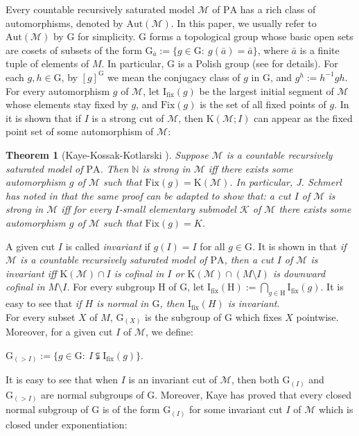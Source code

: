 \documentclass[11pt]{article}
\newtheorem{theorem}{Theorem}[section]
\theoremstyle{plain}
\theoremstyle{definition}
\newcommand{\M}{\mathcal{M}}
\newcommand{\K}{\mathcal{K}}
\newcommand{\NN}{\mathbb{N}}
\newcommand{\I}{\mathrm{I_{fix}}}
\newcommand{\G}{\mathrm{G}}
\newcommand{\A}{\mathrm{Aut}}
\newcommand{\pa}{\mathrm{PA}}
\newcommand{\fix}{\mathrm{Fix}}
\newcommand{\KK}{\mathrm{K}}
\begin{document}
Every countable recursively saturated model $ \M $ of $ \pa $ has a rich class of automorphisms, denoted by $ \A(\M) $. 
In this paper, we usually refer to $\A(\M)$ by $\G$ for simplicity. $\G$ forms a topological group whose  basic open sets are cosets of subsets of the form ${\G_{\bar{a}}:=\{g\in\G: \ g(\bar{a})=\bar{a} \}}  $, where $ \bar{a}$ is a finite tuple of elements of $ M $. In particular, $\G$ is a Polish group (see \cite{km} for details). For each $g,h\in\G$, by $[g]^{\G}$ we mean the conjugacy class of $g$ in $\G$, and $g^{h}:=h^{-1}gh$. For every automorphism $ g $ of $ \M $, let $ \I(g) $ be the largest initial segment of $ \M $ whose elements stay fixed by $ g $, and $ \fix(g) $ is the set of all fixed points of $ g $.  In \cite{kkk} it is shown that if $I$ is a strong cut of $\M$, then $\KK(\M;I)$ can appear as the fixed point set of some automorphism of $\M$:
\begin{theorem}[Kaye-Kossak-Kotlarski \cite{kkk}]
Suppose $\M$ is a countable recursively saturated model of $\pa$. Then $\NN$ is strong in $\M$ iff there exists some automorphism $g$ of $\M$ such that $\fix(g)=\KK(\M)$. In particular, J. Schmerl has noted in \cite[Theorem 5.7]{kkk} that the same proof can be adapted to show that: a cut $I$ of $\M$ is strong in $\M$ iff for every $I$-small elementary submodel $\K$ of $\M$ there exists some automorphism  $g$ of $\M$ such that $\fix(g)=K$.
\end{theorem}
A given cut $ I $ is called \textit{invariant} if $ g(I)=I $ for all $ g\in\G $. It is shown in \cite{kkk} that \textit{if $\M$ is a countable recursively saturated model of $\pa$, then a cut $I$ of $\M$ is invariant iff $\KK(\M)\cap I$ is cofinal in $I$ or $\KK(\M)\cap (M\setminus I)$ is downward cofinal in $M\setminus I$.}
For every subgroup $ \mathrm{H} $ of $ \G $, let $ {\I(\mathrm{H}):=\bigcap_{g\in \mathrm{H}} \I(g)} $. It is easy to see that  \textit{if $ H $ is normal in $ \G $, then $ \I(H) $ is invariant}.\\
 For every subset $X$ of $M$, $\G_{(X)}$ is the subgroup of $\G$ which fixes $X$ pointwise. Moreover, for a given cut $ I $ of $ \M $, we define:
\begin{center}
$ \G_{(>I)}:=\{g\in\G: \ I\subsetneqq\I(g) \}. $
\end{center}
It is easy to see that when $I$ is an invariant cut of $\M$, then both $\G_{(I)}$ and $\G_{(>I)}$ are normal subgroups of $\G$. Moreover, Kaye has proved that every closed normal subgroup of $\G$ is of the form $\G_{(I)}$  for some invariant cut $I$ of $\M$ which is closed under exponentiation:
\end{document}
